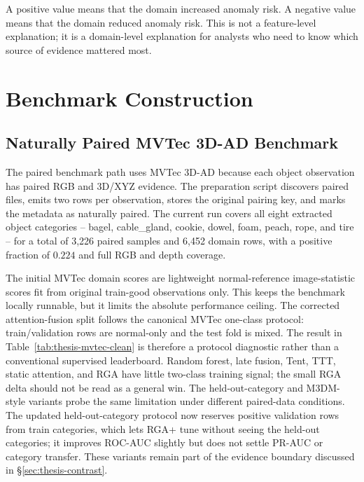 \documentclass[11pt]{article}
\newcommand{\method}{RGA}
\begin{document}
A positive value means that the domain increased anomaly risk. A negative value
means that the domain reduced anomaly risk. This is not a feature-level
explanation; it is a domain-level explanation for analysts who need to know
which source of evidence mattered most.

\section{Benchmark Construction}

\subsection{Naturally Paired MVTec 3D-AD Benchmark}

The paired benchmark path uses MVTec 3D-AD because each object observation has
paired RGB and 3D/XYZ evidence. The preparation script discovers paired files,
emits two rows per observation, stores the original pairing key, and marks the
metadata as naturally paired. The current run covers all eight extracted
object categories -- bagel, cable\_gland, cookie, dowel, foam, peach, rope,
and tire -- for a total of 3{,}226 paired samples and 6{,}452 domain rows,
with a positive fraction of $0.224$ and full RGB and depth coverage.

\begin{table}[H]
\centering
\caption{Naturally paired MVTec 3D-AD multi-category metadata.}
\label{tab:thesis-mvtec-metadata}
\footnotesize

\end{table}

The initial MVTec domain scores are lightweight normal-reference image-statistic
scores fit from original train-good observations only. This keeps the benchmark
locally runnable, but it limits the absolute performance ceiling. The corrected
attention-fusion split follows the canonical MVTec one-class protocol:
train/validation rows are normal-only and the test fold is mixed. The result in
Table~\ref{tab:thesis-mvtec-clean} is therefore a protocol diagnostic rather
than a conventional supervised leaderboard. Random forest, late fusion, Tent,
TTT, static attention, and \method{} have little two-class training signal; the
small \method{} delta should not be read as a general win. The held-out-category
and M3DM-style variants probe the same limitation under different paired-data
conditions. The updated held-out-category protocol now reserves positive
validation rows from train categories, which lets RGA+ tune without seeing the
held-out categories; it improves ROC-AUC slightly but does not settle PR-AUC or
category transfer. These variants remain part of the evidence boundary
discussed in \S\ref{sec:thesis-contrast}.
\end{document}
